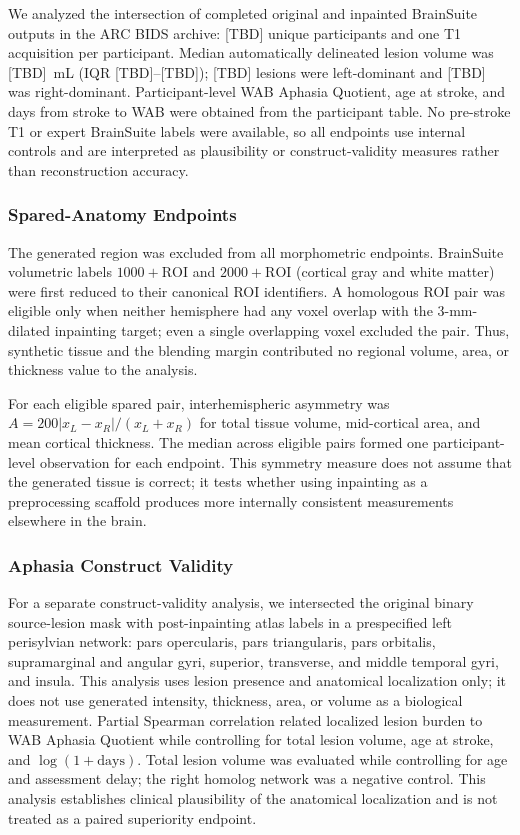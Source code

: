 \documentclass[runningheads]{llncs}
\begin{document}
We analyzed the intersection of completed original and inpainted BrainSuite outputs in the ARC BIDS archive: [TBD] unique participants and one T1 acquisition per participant. Median automatically delineated lesion volume was [TBD]~mL (IQR [TBD]--[TBD]); [TBD] lesions were left-dominant and [TBD] was right-dominant. Participant-level WAB Aphasia Quotient, age at stroke, and days from stroke to WAB were obtained from the participant table. No pre-stroke T1 or expert BrainSuite labels were available, so all endpoints use internal controls and are interpreted as plausibility or construct-validity measures rather than reconstruction accuracy.





\subsubsection{Spared-Anatomy Endpoints}
The generated region was excluded from all morphometric endpoints. BrainSuite volumetric labels \(1000+\mathrm{ROI}\) and \(2000+\mathrm{ROI}\) (cortical gray and white matter) were first reduced to their canonical ROI identifiers. A homologous ROI pair was eligible only when neither hemisphere had any voxel overlap with the 3-mm-dilated inpainting target; even a single overlapping voxel excluded the pair. Thus, synthetic tissue and the blending margin contributed no regional volume, area, or thickness value to the analysis.

For each eligible spared pair, interhemispheric asymmetry was \(A=200|x_L-x_R|/(x_L+x_R)\) for total tissue volume, mid-cortical area, and mean cortical thickness. The median across eligible pairs formed one participant-level observation for each endpoint. This symmetry measure does not assume that the generated tissue is correct; it tests whether using inpainting as a preprocessing scaffold produces more internally consistent measurements elsewhere in the brain.

\subsubsection{Aphasia Construct Validity}
For a separate construct-validity analysis, we intersected the original binary source-lesion mask with post-inpainting atlas labels in a prespecified left perisylvian network: pars opercularis, pars triangularis, pars orbitalis, supramarginal and angular gyri, superior, transverse, and middle temporal gyri, and insula. This analysis uses lesion presence and anatomical localization only; it does not use generated intensity, thickness, area, or volume as a biological measurement. Partial Spearman correlation related localized lesion burden to WAB Aphasia Quotient while controlling for total lesion volume, age at stroke, and \(\log(1+\mathrm{days})\). Total lesion volume was evaluated while controlling for age and assessment delay; the right homolog network was a negative control. This analysis establishes clinical plausibility of the anatomical localization and is not treated as a paired superiority endpoint.
\end{document}
